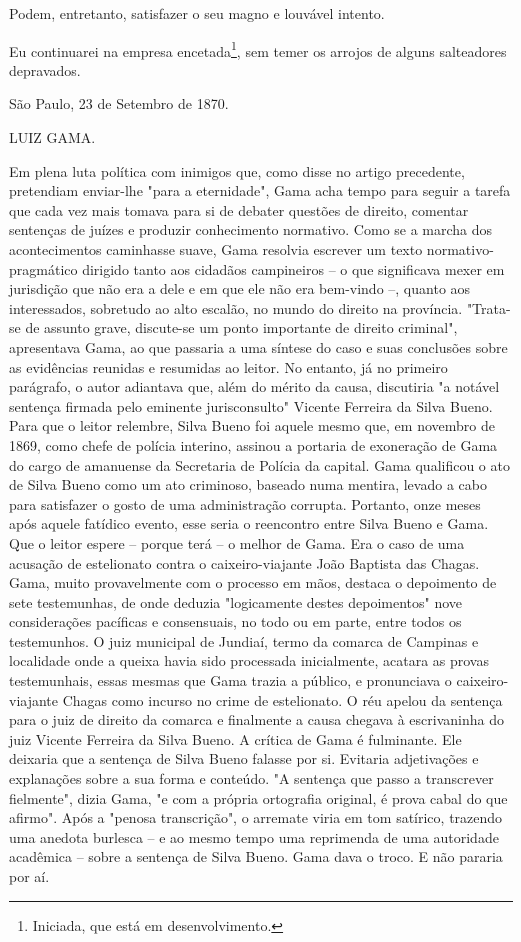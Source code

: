 Podem, entretanto, satisfazer o seu magno e louvável intento.

Eu continuarei na empresa encetada\footnote{Iniciada, que está em
  desenvolvimento.}, sem
temer os arrojos de alguns salteadores depravados.

São Paulo, 23 de Setembro de 1870.

LUIZ GAMA.

\pagebreak
\mbox{}\vfill
\thispagestyle{empty}

{\small\noindent
Em plena luta política com inimigos que, como disse no artigo
precedente, pretendiam enviar-lhe "para a eternidade", Gama acha tempo
para seguir a tarefa que cada vez mais tomava para si de debater
questões de direito, comentar sentenças de juízes e produzir
conhecimento normativo. Como se a marcha dos acontecimentos caminhasse
suave, Gama resolvia escrever um texto normativo-pragmático dirigido
tanto aos cidadãos campineiros -- o que significava mexer em jurisdição
que não era a dele e em que ele não era bem-vindo --, quanto aos
interessados, sobretudo ao alto escalão, no mundo do direito na
província. "Trata-se de assunto grave, discute-se um ponto importante de
direito criminal", apresentava Gama, ao que passaria a uma síntese do
caso e suas conclusões sobre as evidências reunidas e resumidas ao
leitor. No entanto, já no primeiro parágrafo, o autor adiantava que,
além do mérito da causa, discutiria "a notável sentença firmada pelo
eminente jurisconsulto" Vicente Ferreira da Silva Bueno. Para que o
leitor relembre, Silva Bueno foi aquele mesmo que, em novembro de 1869,
como chefe de polícia interino, assinou a portaria de exoneração de Gama
do cargo de amanuense da Secretaria de Polícia da capital. Gama
qualificou o ato de Silva Bueno como um ato criminoso, baseado numa
mentira, levado a cabo para satisfazer o gosto de uma administração
corrupta. Portanto, onze meses após aquele fatídico evento, esse seria o
reencontro entre Silva Bueno e Gama. Que o leitor espere -- porque terá
-- o melhor de Gama. Era o caso de uma acusação de estelionato contra o
caixeiro-viajante João Baptista das Chagas. Gama, muito provavelmente
com o processo em mãos, destaca o depoimento de sete testemunhas, de
onde deduzia "logicamente destes depoimentos" nove considerações
pacíficas e consensuais, no todo ou em parte, entre todos os
testemunhos. O juiz municipal de Jundiaí, termo da comarca de Campinas e
localidade onde a queixa havia sido processada inicialmente, acatara as
provas testemunhais, essas mesmas que Gama trazia a público, e
pronunciava o caixeiro-viajante Chagas como incurso no crime de
estelionato. O réu apelou da sentença para o juiz de direito da comarca
e finalmente a causa chegava à escrivaninha do juiz Vicente Ferreira da
Silva Bueno. A crítica de Gama é fulminante. Ele deixaria que a sentença
de Silva Bueno falasse por si. Evitaria adjetivações e explanações sobre
a sua forma e conteúdo. "A sentença que passo a transcrever fielmente",
dizia Gama, "e com a própria ortografia original, é prova cabal do que
afirmo". Após a "penosa transcrição", o arremate viria em tom satírico,
trazendo uma anedota burlesca -- e ao mesmo tempo uma reprimenda de uma
autoridade acadêmica -- sobre a sentença de Silva Bueno. Gama dava o
troco. E não pararia por aí. }

